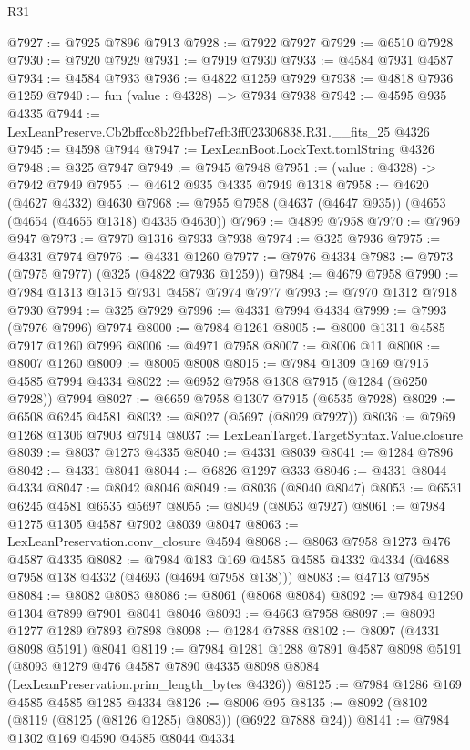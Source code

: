 \begin{lexlean}{R31}
\begin{coremodule}
@7927 := @7925 @7896 @7913
@7928 := @7922 @7927
@7929 := @6510 @7928
@7930 := @7920 @7929
@7931 := @7919 @7930
@7933 := @4584 @7931 @4587
@7934 := @4584 @7933
@7936 := @4822 @1259 @7929
@7938 := @4818 @7936 @1259
@7940 := fun (value : @4328) => @7934 @7938
@7942 := @4595 @935 @4335
@7944 := LexLeanPreserve.Cb2bffcc8b22fbbef7efb3ff023306838.R31.__fits_25 @4326
@7945 := @4598 @7944
@7947 := LexLeanBoot.LockText.tomlString @4326
@7948 := @325 @7947
@7949 := @7945 @7948
@7951 := (value : @4328) -> @7942 @7949
@7955 := @4612 @935 @4335 @7949 @1318
@7958 := @4620 (@4627 @4332) @4630
@7968 := @7955 @7958 (@4637 (@4647 @935)) (@4653 (@4654 (@4655 @1318) @4335 @4630))
@7969 := @4899 @7958
@7970 := @7969 @947
@7973 := @7970 @1316 @7933 @7938
@7974 := @325 @7936
@7975 := @4331 @7974
@7976 := @4331 @1260
@7977 := @7976 @4334
@7983 := @7973 (@7975 @7977) (@325 (@4822 @7936 @1259))
@7984 := @4679 @7958
@7990 := @7984 @1313 @1315 @7931 @4587 @7974 @7977
@7993 := @7970 @1312 @7918 @7930
@7994 := @325 @7929
@7996 := @4331 @7994 @4334
@7999 := @7993 (@7976 @7996) @7974
@8000 := @7984 @1261
@8005 := @8000 @1311 @4585 @7917 @1260 @7996
@8006 := @4971 @7958
@8007 := @8006 @11
@8008 := @8007 @1260
@8009 := @8005 @8008
@8015 := @7984 @1309 @169 @7915 @4585 @7994 @4334
@8022 := @6952 @7958 @1308 @7915 (@1284 (@6250 @7928)) @7994
@8027 := @6659 @7958 @1307 @7915 (@6535 @7928)
@8029 := @6508 @6245 @4581
@8032 := @8027 (@5697 (@8029 @7927))
@8036 := @7969 @1268 @1306 @7903 @7914
@8037 := LexLeanTarget.TargetSyntax.Value.closure
@8039 := @8037 @1273 @4335
@8040 := @4331 @8039
@8041 := @1284 @7896
@8042 := @4331 @8041
@8044 := @6826 @1297 @333
@8046 := @4331 @8044 @4334
@8047 := @8042 @8046
@8049 := @8036 (@8040 @8047)
@8053 := @6531 @6245 @4581 @6535 @5697
@8055 := @8049 (@8053 @7927)
@8061 := @7984 @1275 @1305 @4587 @7902 @8039 @8047
@8063 := LexLeanPreservation.conv_closure @4594
@8068 := @8063 @7958 @1273 @476 @4587 @4335
@8082 := @7984 @183 @169 @4585 @4585 @4332 @4334 (@4688 @7958 @138 @4332 (@4693 (@4694 @7958 @138)))
@8083 := @4713 @7958
@8084 := @8082 @8083
@8086 := @8061 (@8068 @8084)
@8092 := @7984 @1290 @1304 @7899 @7901 @8041 @8046
@8093 := @4663 @7958
@8097 := @8093 @1277 @1289 @7893 @7898
@8098 := @1284 @7888
@8102 := @8097 (@4331 @8098 @5191) @8041
@8119 := @7984
    @1281
    @1288
    @7891
    @4587
    @8098
    @5191
    (@8093 @1279 @476 @4587 @7890 @4335 @8098 @8084 (LexLeanPreservation.prim_length_bytes @4326))
@8125 := @7984 @1286 @169 @4585 @4585 @1285 @4334
@8126 := @8006 @95
@8135 := @8092 (@8102 (@8119 (@8125 (@8126 @1285) @8083)) (@6922 @7888 @24))
@8141 := @7984 @1302 @169 @4590 @4585 @8044 @4334

\end{coremodule}
\end{lexlean}
